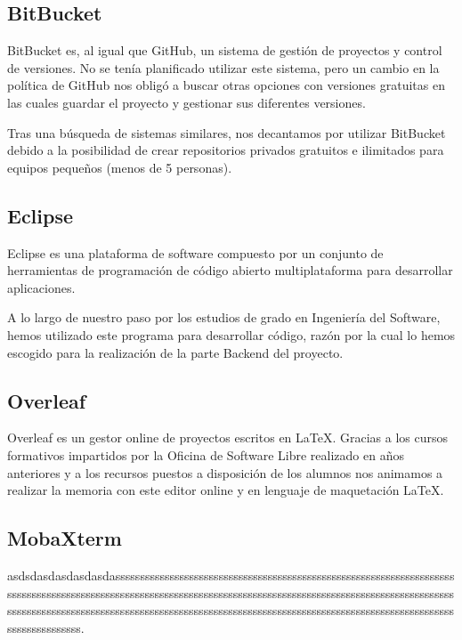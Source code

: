      \subsection{BitBucket}
     BitBucket es, al igual que GitHub, un sistema de gestión de proyectos y control de versiones. No se tenía planificado utilizar este sistema, pero un cambio en la política de GitHub nos obligó a buscar otras opciones con versiones gratuitas en las cuales guardar el proyecto y gestionar sus diferentes versiones.
     \newline
     
     Tras una búsqueda de sistemas similares, nos decantamos por utilizar BitBucket debido a la posibilidad de crear repositorios privados gratuitos e ilimitados para equipos pequeños (menos de 5 personas).
     
     \subsection{Eclipse}
     Eclipse es una plataforma de software compuesto por un conjunto de herramientas de programación de código abierto multiplataforma para desarrollar aplicaciones\cite{eclipse}.
     \newline
     
     A lo largo de nuestro paso por los estudios de grado en Ingeniería del Software, hemos utilizado este programa para desarrollar código, razón por la cual lo hemos escogido para la realización de la parte Backend del proyecto.
     
     
     \subsection{Overleaf}
     Overleaf es un gestor online de proyectos escritos en \LaTeX. Gracias a los cursos formativos impartidos por la Oficina de Software Libre\cite{ucmsoftwarelibre} realizado en años anteriores y a los recursos puestos a disposición de los alumnos\cite{recursoslatex} nos animamos a realizar la memoria con este editor online y en lenguaje de maquetación \LaTeX.
     
     
         \subsection{MobaXterm}
    asdsdasdasdasdasdassssssssssssssssssssssssssssssssssssssssssssssssssssssssssssssssssssssssssssssssssssssssssssssssssssssssssssssssssssssssssssssssssssssssssssssssssssssssssssssssssssssssssssssssssssssssssssssssssssssssssssssssssssssssssssssssssssssssssssssssssssssssssssssssssssssssss.
    \newline
    
